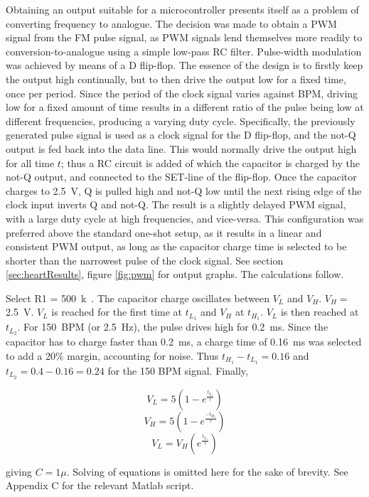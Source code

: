 Obtaining an output suitable for a microcontroller presents itself as a problem of converting frequency to analogue. The decision was made to obtain a PWM signal from the FM pulse signal, as PWM signals lend themselves more readily to conversion-to-analogue using a simple low-pass RC filter. Pulse-width modulation was achieved by means of a D flip-flop. The essence of the design is to firstly keep the output high continually, but to then drive the output low for a fixed time, once per period. Since the period of the clock signal varies against BPM, driving low for a fixed amount of time results in a different ratio of the pulse being low at different frequencies, producing a varying duty cycle. Specifically, the previously generated pulse signal is used as a clock signal for the D flip-flop, and the not-Q output is fed back into the data line. This would normally drive the output high for all time $t$; thus a RC circuit is added of which the capacitor is charged by the not-Q output, and connected to the SET-line of the flip-flop. Once the capacitor charges to \SI{2.5}{V}, Q is pulled high and not-Q low until the next rising edge of the clock input inverts Q and not-Q. The result is a slightly delayed PWM signal, with a large duty cycle at high frequencies, and vice-versa. This configuration was preferred above the standard one-shot setup, as it results in a linear and consistent PWM output, as long as the capacitor charge time is selected to be shorter than the narrowest pulse of the clock signal. See section \ref{sec:heartResults}, figure \ref{fig:pwm} for output graphs. The calculations follow.

Select R1 = \SI{500}{k\Omega}. The capacitor charge oscillates between $V_L$ and $V_H$. $V_H =$ \SI{2.5}{V}. $V_L$ is reached for the first time at $t_{L_1}$ and $V_H$ at $t_{H_1}$. $V_L$ is then reached at  $t_{L_2}$. For \SI{150}{BPM} (or \SI{2.5}{Hz}), the pulse drives high for \SI{0.2}{ms}. Since the capacitor has to charge faster than \SI{0.2}{ms}, a charge time of \SI{0.16}{ms} was selected to add a 20\% margin, accounting for noise. Thus $t_{H_1} - t_{L_1} = 0.16$ and $t_{L_2} = 0.4 - 0.16 = 0.24$ for the 150 BPM signal. Finally,

$$V_L = 5\left(1-e^{\frac{t_{L_1}}{\tau}}\right)$$
$$V_H = 5\left(1-e^{\frac{-t_{H_1}}{\tau}}\right)$$
$$V_L = V_H\left(e^{\frac{t_{L_1}}{\tau}}\right)$$

giving $C = 1\mu$. Solving of equations is omitted here for the sake of brevity. See Appendix C for the relevant Matlab script.



